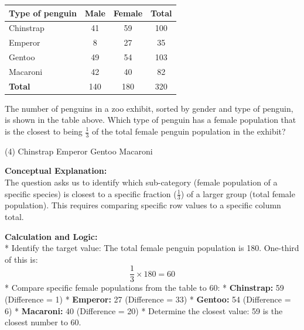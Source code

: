 \documentclass[11pt,paper=a4,answers]{exam}
\begin{document}
\begin{questions}
\pointsinrightmargin
\pointsdroppedatright
\marksnotpoints
{}
\pointformat{\boldmath\themarginpoints}
\bracketedpoints

\question
\begin{center}
\begin{tabular}{|l|c|c|c|}
\hline
\textbf{Type of penguin} & \textbf{Male} & \textbf{Female} & \textbf{Total} \\ \hline
Chinstrap & 41 & 59 & 100 \\ \hline
Emperor & 8 & 27 & 35 \\ \hline
Gentoo & 49 & 54 & 103 \\ \hline
Macaroni & 42 & 40 & 82 \\ \hline
\textbf{Total} & 140 & 180 & 320 \\ \hline
\end{tabular}
\end{center}
The number of penguins in a zoo exhibit, sorted by gender and type of penguin, is shown in the table above. Which type of penguin has a female population that is the closest to being $\frac{1}{3}$ of the total female penguin population in the exhibit?
\begin{tasks}(4)
    \task Chinstrap
    \task Emperor
    \task Gentoo
    \task Macaroni
\end{tasks}

\begin{solution}
\textbf{Conceptual Explanation:} \\
The question asks us to identify which sub-category (female population of a specific species) is closest to a specific fraction ($\frac{1}{3}$) of a larger group (total female population). This requires comparing specific row values to a specific column total.

\vspace{30pt}

\textbf{Calculation and Logic:} \\
* Identify the target value: The total female penguin population is 180. One-third of this is:
\[ \frac{1}{3} \times 180 = 60 \]
* Compare specific female populations from the table to 60:
    * \textbf{Chinstrap:} 59 (Difference = 1)
    * \textbf{Emperor:} 27 (Difference = 33)
    * \textbf{Gentoo:} 54 (Difference = 6)
    * \textbf{Macaroni:} 40 (Difference = 20)
* Determine the closest value: 59 is the closest number to 60.


\end{solution}
\end{questions}
\end{document}
